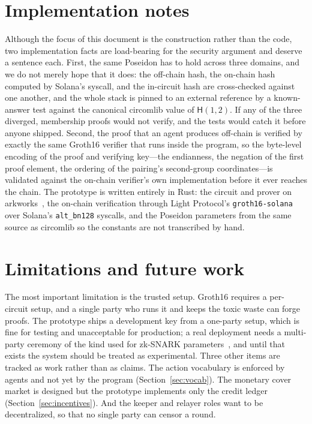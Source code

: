 \documentclass[11pt]{article}
\newcommand{\hash}{\mathsf{H}}
\newcommand{\code}[1]{\texttt{#1}}
\begin{document}
\section{Implementation notes}
\label{sec:impl}

Although the focus of this document is the construction rather than the code, two
implementation facts are load-bearing for the security argument and deserve a
sentence each. First, the same Poseidon has to hold across three domains, and we
do not merely hope that it does: the off-chain hash, the on-chain hash computed by
Solana's syscall, and the in-circuit hash are cross-checked against one another,
and the whole stack is pinned to an external reference by a known-answer test
against the canonical circomlib value of $\hash(1,2)$. If any of the three
diverged, membership proofs would not verify, and the tests would catch it before
anyone shipped. Second, the proof that an agent produces off-chain is verified by
exactly the same Groth16 verifier that runs inside the program, so the byte-level
encoding of the proof and verifying key---the endianness, the negation of the
first proof element, the ordering of the pairing's second-group coordinates---is
validated against the on-chain verifier's own implementation before it ever
reaches the chain. The prototype is written entirely in Rust: the circuit and
prover on arkworks~\cite{arkworks}, the on-chain verification through Light
Protocol's \code{groth16-solana}~\cite{light} over Solana's \code{alt\_bn128}
syscalls, and the Poseidon parameters from the same source as circomlib so the
constants are not transcribed by hand.

\section{Limitations and future work}
\label{sec:limits}

The most important limitation is the trusted setup. Groth16 requires a per-circuit
setup, and a single party who runs it and keeps the toxic waste can forge proofs.
The prototype ships a development key from a one-party setup, which is fine for
testing and unacceptable for production; a real deployment needs a multi-party
ceremony of the kind used for zk-SNARK parameters~\cite{ptau}, and until that
exists the system should be treated as experimental. Three other items are
tracked as work rather than as claims. The action vocabulary is enforced by
agents and not yet by the program (Section~\ref{sec:vocab}). The monetary cover
market is designed but the prototype implements only the credit ledger
(Section~\ref{sec:incentives}). And the keeper and relayer roles want to be
decentralized, so that no single party can censor a round.
\end{document}
